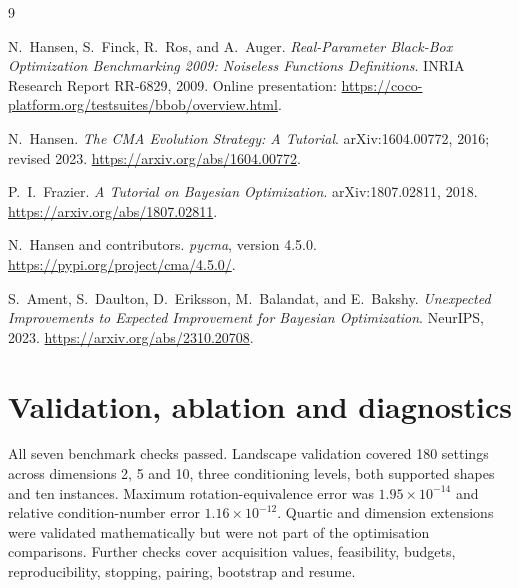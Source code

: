 \documentclass[12pt]{article}
\begin{document}
\clearpage
\begin{thebibliography}{9}

N.~Hansen, S.~Finck, R.~Ros, and A.~Auger.
\newblock \emph{Real-Parameter Black-Box Optimization Benchmarking 2009:
Noiseless Functions Definitions}.
\newblock INRIA Research Report RR-6829, 2009.
\newblock Online presentation:
\url{https://coco-platform.org/testsuites/bbob/overview.html}.

N.~Hansen.
\newblock \emph{The CMA Evolution Strategy: A Tutorial}.
\newblock arXiv:1604.00772, 2016; revised 2023.
\newblock \url{https://arxiv.org/abs/1604.00772}.

P.~I.~Frazier.
\newblock \emph{A Tutorial on Bayesian Optimization}.
\newblock arXiv:1807.02811, 2018.
\newblock \url{https://arxiv.org/abs/1807.02811}.

N.~Hansen and contributors.
\newblock \emph{pycma}, version 4.5.0.
\newblock \url{https://pypi.org/project/cma/4.5.0/}.

S.~Ament, S.~Daulton, D.~Eriksson, M.~Balandat, and E.~Bakshy.
\newblock \emph{Unexpected Improvements to Expected Improvement for Bayesian Optimization}.
\newblock NeurIPS, 2023. \url{https://arxiv.org/abs/2310.20708}.


\end{thebibliography}
\clearpage
\appendix
\section{Validation, ablation and diagnostics}
\label{app:validation}\label{app:ablation}\label{app:diagnostics}
All seven benchmark checks passed. Landscape validation covered 180 settings
across dimensions 2, 5 and 10, three conditioning levels, both supported
shapes and ten instances. Maximum rotation-equivalence error was
$1.95\times10^{-14}$ and relative condition-number error $1.16\times10^{-12}$.
Quartic and dimension extensions were validated mathematically but were not
part of the optimisation comparisons. Further checks cover acquisition values,
feasibility, budgets, reproducibility, stopping, pairing, bootstrap and resume.
\end{document}
